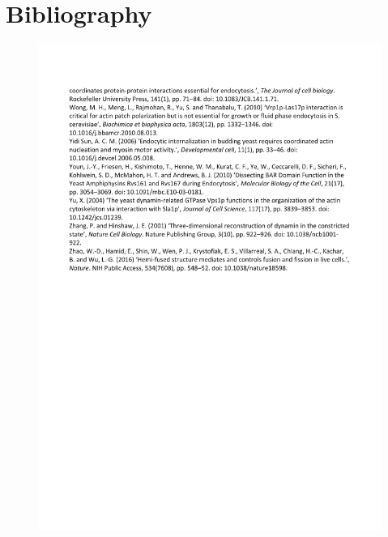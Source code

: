 \chapter*{Bibliography} %
\pagestyle{plain}

\begin{figure}[H]
\includegraphics[scale=1.5]{parts/bib_end}
\end{figure}